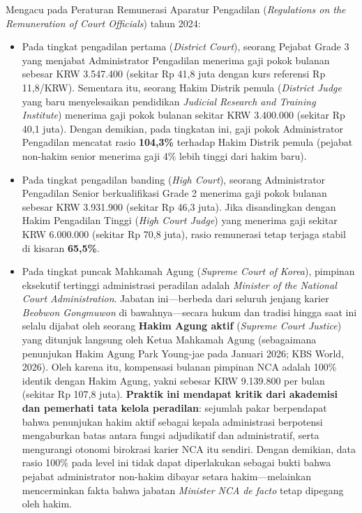\documentclass[12pt, a4paper]{article}
\begin{document}
Mengacu pada Peraturan Remunerasi Aparatur Pengadilan (\textit{Regulations on the Remuneration of Court Officials}) tahun 2024:
\begin{itemize}
    \item Pada tingkat pengadilan pertama (\textit{District Court}), seorang Pejabat Grade 3 yang menjabat Administrator Pengadilan menerima gaji pokok bulanan sebesar KRW 3.547.400 (sekitar Rp 41,8 juta dengan kurs referensi Rp 11,8/KRW). Sementara itu, seorang Hakim Distrik pemula (\textit{District Judge} yang baru menyelesaikan pendidikan \textit{Judicial Research and Training Institute}) menerima gaji pokok bulanan sekitar KRW 3.400.000 (sekitar Rp 40,1 juta). Dengan demikian, pada tingkatan ini, gaji pokok Administrator Pengadilan mencatat rasio \textbf{104,3\%} terhadap Hakim Distrik pemula (pejabat non-hakim senior menerima gaji 4\% lebih tinggi dari hakim baru).
    \item Pada tingkat pengadilan banding (\textit{High Court}), seorang Administrator Pengadilan Senior berkualifikasi Grade 2 menerima gaji pokok bulanan sebesar KRW 3.931.900 (sekitar Rp 46,3 juta). Jika disandingkan dengan Hakim Pengadilan Tinggi (\textit{High Court Judge}) yang menerima gaji sekitar KRW 6.000.000 (sekitar Rp 70,8 juta), rasio remunerasi tetap terjaga stabil di kisaran \textbf{65,5\%}.
    \item Pada tingkat puncak Mahkamah Agung (\textit{Supreme Court of Korea}), pimpinan eksekutif tertinggi administrasi peradilan adalah \textit{Minister of the National Court Administration}. Jabatan ini---berbeda dari seluruh jenjang karier \textit{Beobwon Gongmuwon} di bawahnya---secara hukum dan tradisi hingga saat ini selalu dijabat oleh seorang \textbf{Hakim Agung aktif} (\textit{Supreme Court Justice}) yang ditunjuk langsung oleh Ketua Mahkamah Agung (sebagaimana penunjukan Hakim Agung Park Young-jae pada Januari 2026; KBS World, 2026). Oleh karena itu, kompensasi bulanan pimpinan NCA adalah 100\% identik dengan Hakim Agung, yakni sebesar KRW 9.139.800 per bulan (sekitar Rp 107,8 juta). \textbf{Praktik ini mendapat kritik dari akademisi dan pemerhati tata kelola peradilan}: sejumlah pakar berpendapat bahwa penunjukan hakim aktif sebagai kepala administrasi berpotensi mengaburkan batas antara fungsi adjudikatif dan administratif, serta mengurangi otonomi birokrasi karier NCA itu sendiri. Dengan demikian, data rasio 100\% pada level ini tidak dapat diperlakukan sebagai bukti bahwa pejabat administrator non-hakim dibayar setara hakim---melainkan mencerminkan fakta bahwa jabatan \textit{Minister NCA} \textit{de facto} tetap dipegang oleh hakim.
\end{itemize}
\end{document}
